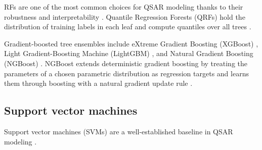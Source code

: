 RFs are one of the most common choices for QSAR modeling thanks to their robustness and interpretability \citep{Svetnik2003}. Quantile Regression Forests (QRFs) hold the distribution of training labels in each leaf and compute quantiles over all trees \citep{Meinshausen2006}.

Gradient-boosted tree ensembles include eXtreme Gradient Boosting (XGBoost) \citep{Mustapha2016, Tian2022}, Light Gradient-Boosting Machine (LightGBM) \citep{ke2017lightgbm}, and Natural Gradient Boosting (NGBoost) \citep{Duan2020}. NGBoost extends deterministic gradient boosting by treating the parameters of a chosen parametric distribution as regression targets and learns them through boosting with a natural gradient update rule \citep{Duan2020}.


\subsection{Support vector machines}

Support vector machines (SVMs) are a well-established baseline in QSAR modeling \citep{Vapnik1995, Svetnik2003}.

